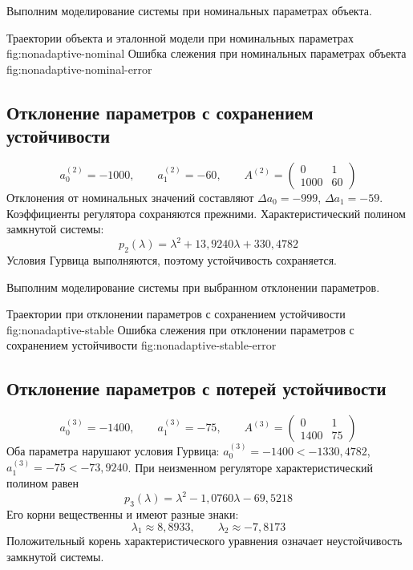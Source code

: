 Выполним моделирование системы при номинальных параметрах объекта.

  {Траектории объекта и эталонной модели при номинальных параметрах}
  {fig:nonadaptive-nominal}
  {Ошибка слежения при номинальных параметрах объекта}
  {fig:nonadaptive-nominal-error}

\subsection{Отклонение параметров с сохранением устойчивости}

\begin{equation}
  a_0^{(2)}=-1000,
  \qquad a_1^{(2)}=-60,
  \qquad A^{(2)}=\begin{pmatrix}0&1\\1000&60\end{pmatrix}
\end{equation}
Отклонения от номинальных значений составляют $\Delta a_0=-999$,
$\Delta a_1=-59$. Коэффициенты регулятора сохраняются прежними.
Характеристический полином замкнутой системы:
\begin{equation}
  p_2(\lambda)=\lambda^2+13{,}9240\lambda+330{,}4782
\end{equation}
Условия Гурвица выполняются, поэтому устойчивость сохраняется.

Выполним моделирование системы при выбранном отклонении параметров.

  {Траектории при отклонении параметров с сохранением устойчивости}
  {fig:nonadaptive-stable}
  {Ошибка слежения при отклонении параметров с сохранением устойчивости}
  {fig:nonadaptive-stable-error}

\subsection{Отклонение параметров с потерей устойчивости}

\begin{equation}
  a_0^{(3)}=-1400,
  \qquad a_1^{(3)}=-75,
  \qquad A^{(3)}=\begin{pmatrix}0&1\\1400&75\end{pmatrix}
\end{equation}
Оба параметра нарушают условия Гурвица:
$a_0^{(3)}=-1400<-1330{,}4782$,
$a_1^{(3)}=-75<-73{,}9240$.
При неизменном регуляторе характеристический полином равен
\begin{equation}
  p_3(\lambda)=\lambda^2-1{,}0760\lambda-69{,}5218
\end{equation}
Его корни вещественны и имеют разные знаки:
\begin{equation}
  \lambda_1\approx8{,}8933,
  \qquad \lambda_2\approx-7{,}8173
\end{equation}
Положительный корень характеристического уравнения означает
неустойчивость замкнутой системы.


